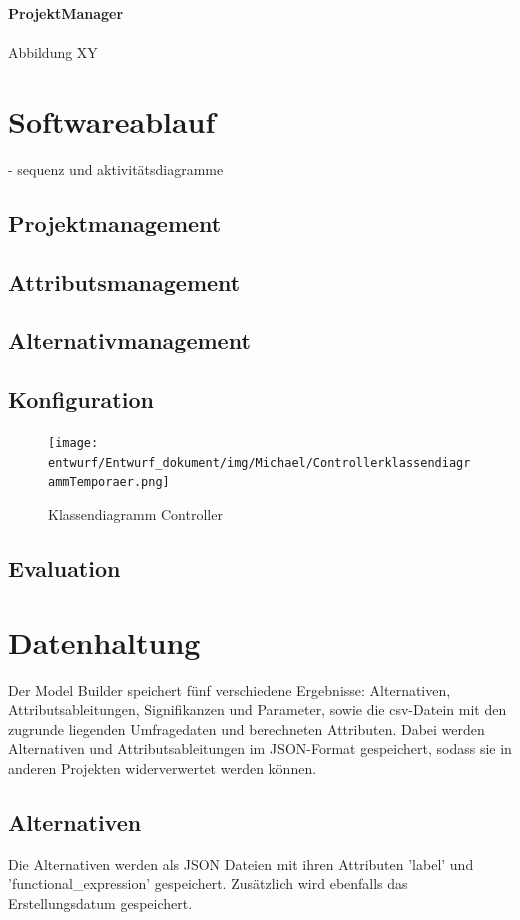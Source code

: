 \documentclass{article}
\begin{document}
\newpage
\textbf{\large{ProjektManager}}\\\\
Abbildung XY






\section{Softwareablauf}
- sequenz und aktivitätsdiagramme
\subsection{Projektmanagement}
\subsection{Attributsmanagement}
\subsection{Alternativmanagement}
\subsection{Konfiguration}

\begin{figure}[H]%
    \centering
    \texttt{[image: entwurf/Entwurf\_dokument/img/Michael/ControllerklassendiagrammTemporaer.png]}
    \caption{Klassendiagramm Controller}
\end{figure}

\subsection{Evaluation}


\section{Datenhaltung}

Der Model Builder speichert fünf verschiedene Ergebnisse: Alternativen, Attributsableitungen, Signifikanzen und Parameter, sowie die csv-Datein mit den zugrunde liegenden Umfragedaten und berechneten Attributen. Dabei werden Alternativen und Attributsableitungen im JSON-Format gespeichert, sodass sie in anderen Projekten widerverwertet werden können.

\subsection{Alternativen}
Die Alternativen werden als JSON Dateien mit ihren Attributen 'label' und 'functional\_expression' gespeichert. Zusätzlich wird ebenfalls das Erstellungsdatum gespeichert.
\end{document}
